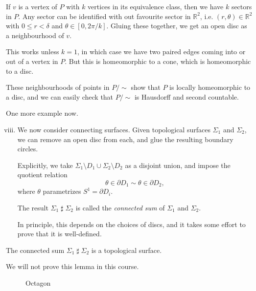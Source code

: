 \documentclass[12pt]{article}
\DeclareMathOperator{\hash}{\sharp}%
\begin{document}
\begin{proofbox}
	If $v$ is a vertex of $P$ with $k$ vertices in its equivalence class, then we have $k$ sectors in $P$. Any sector can be identified with out favourite sector in $\mathbb{R}^2$, i.e. $(r, \theta) \in \mathbb{R}^2$ with $0 \leq r < \delta$ and $\theta \in [0, 2\pi/k]$. Gluing these together, we get an open disc as a neighbourhood of $v$.

	This works unless $k = 1$, in which case we have two paired edges coming into or out of a vertex in $P$. But this is homeomorphic to a cone, which is homeomorphic to a disc.

	These neighbourhoods of points in $P/\sim$ show that $P$ is locally homeomorphic to a disc, and we can easily check that $P/\sim$ is Hausdorff and second countable.
\end{proofbox}

\begin{exbox}
	One more example now.
	\begin{enumerate}[(i)]
		\setcounter{enumi}{7}
		\item We now consider connecting surfaces. Given topological surfaces $\Sigma_1$ and $\Sigma_2$, we can remove an open disc from each, and glue the resulting boundary circles.

			Explicitly, we take $\Sigma_1 \setminus D_1 \cup \Sigma_2 \setminus D_2$ as a disjoint union, and impose the quotient relation
			\[
			\theta \in \partial D_1 \sim \theta \in \partial D_2
			,\]
			where $\theta$ parametrizes $S^{1} = \partial D_i$.

			The result $\Sigma_1 \hash \Sigma_2$ is called the \emph{connected sum} of $\Sigma_1$ and $\Sigma_2$.

			In principle, this depends on the choices of discs, and it takes some effort to prove that it is well-defined.
	\end{enumerate}
\end{exbox}

\begin{lemma}
	The connected sum $\Sigma_1 \hash \Sigma_2$ is a topological surface.
\end{lemma}

We will not prove this lemma in this course.

\begin{figure}[h]
	\centering
	\caption{Octagon}
	\label{fig:octagon}
\end{figure}
\end{document}
